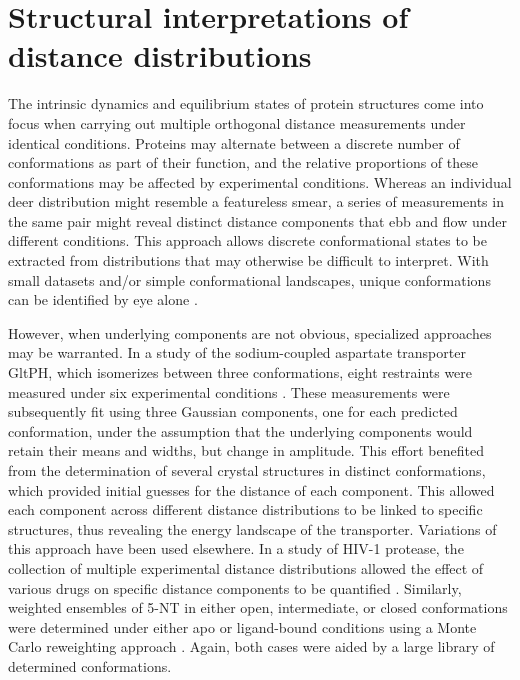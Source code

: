 \section{Structural interpretations of distance distributions}\label{sec:deerintro_globalanalysis}

The intrinsic dynamics and equilibrium states of protein structures come into focus when carrying out multiple orthogonal distance measurements under identical conditions. Proteins may alternate between a discrete number of conformations as part of their function, and the relative proportions of these conformations may be affected by experimental conditions. Whereas an individual \gls{deer} distribution might resemble a featureless smear, a series of measurements in the same pair might reveal distinct distance components that ebb and flow under different conditions. This approach allows discrete conformational states to be extracted from distributions that may otherwise be difficult to interpret. With small datasets and/or simple conformational landscapes, unique conformations can be identified by eye alone \citep*{Barth2018, Duss2014, Kazmier2014a, Manglik2015}.

However, when underlying components are not obvious, specialized approaches may be warranted. In a study of the sodium-coupled aspartate transporter GltPH, which isomerizes between three conformations, eight restraints were measured under six experimental conditions \citep*{Georgieva2013}. These measurements were subsequently fit using three Gaussian components, one for each predicted conformation, under the assumption that the underlying components would retain their means and widths, but change in amplitude. This effort benefited from the determination of several crystal structures in distinct conformations, which provided initial guesses for the distance of each component. This allowed each component across different distance distributions to be linked to specific structures, thus revealing the energy landscape of the transporter. Variations of this approach have been used elsewhere. In a study of HIV-1 protease, the collection of multiple experimental distance distributions allowed the effect of various drugs on specific distance components to be quantified \citep*{Blackburn2009, Casey2015}. Similarly, weighted ensembles of 5-NT in either open, intermediate, or closed conformations were determined under either apo or ligand-bound conditions using a Monte Carlo reweighting approach \citep*{Krug2016}. Again, both cases were aided by a large library of determined conformations.

